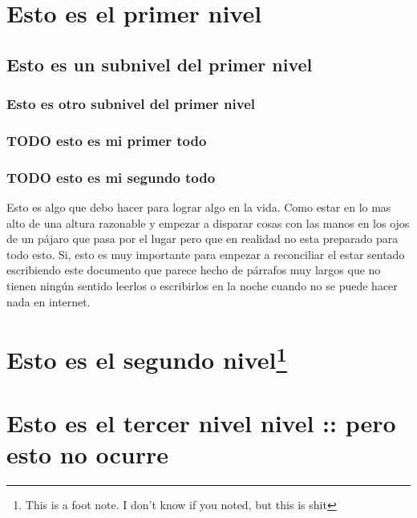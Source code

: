 \documentclass[11pt]{article}
\author{Pablo}
\date{\today}
\title{}
\begin{document}
\tableofcontents

\section{Esto es el primer nivel}
\label{sec:orgheadline5}
\subsection{Esto es un subnivel del primer nivel}
\label{sec:orgheadline4}
\subsubsection{Esto es otro subnivel del primer nivel}
\label{sec:orgheadline1}
\subsubsection{{\bfseries\sffamily TODO} esto es mi primer todo}
\label{sec:orgheadline2}
\subsubsection{{\bfseries\sffamily TODO} esto es mi segundo todo}
\label{sec:orgheadline3}

Esto es algo que debo hacer para lograr algo en la vida. Como estar en lo mas alto de una altura razonable y empezar a disparar cosas con las manos en los ojos de un pájaro que pasa por el lugar pero que en realidad no esta preparado para todo esto. Si, esto es muy importante para empezar a reconciliar el estar sentado escribiendo este documento que parece hecho de párrafos muy largos que no tienen ningún sentido leerlos o escribirlos en la noche cuando no se puede hacer nada en internet.
\section{Esto es el segundo nivel\footnote{This is a foot note. I don't know if you noted, but this is shit}}
\label{sec:orgheadline6}
\section{Esto es el tercer nivel          nivel :: pero esto no ocurre}
\label{sec:orgheadline8}
\end{document}
